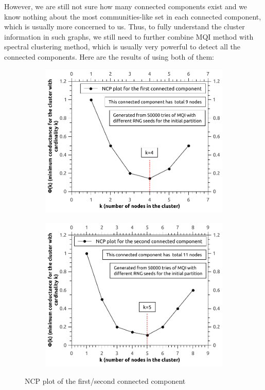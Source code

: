 \documentclass[12pt]{article}
\begin{document}
However, we are still not sure how many connected components exist and we know nothing about the most communities-like set in each connected component, which is usually more concerned to us. Thus, to fully understand the cluster information in such graphs, we still need to further combine MQI method with spectral clustering method, which is usually very powerful to detect all the connected components. Here are the results of using both of them:\\
\begin{figure}[H]
  \begin{subfigure}[b]{0.5\textwidth}
    \includegraphics[scale=0.66]{MQI_1.pdf}     
    \label{fig:1}
  \end{subfigure}
  \begin{subfigure}[b]{0.5\textwidth}
    \includegraphics[scale=0.66]{MQI_2.pdf} 
    \label{fig:2}
  \end{subfigure}
  \caption{NCP plot of the first/second connected component}
\end{figure}
\end{document}
